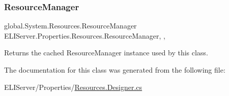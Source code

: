 \subsubsection{\texorpdfstring{Resource\+Manager}{ResourceManager}}
{\footnotesize\ttfamily global.\+System.\+Resources.\+Resource\+Manager E\+L\+I\+Server.\+Properties.\+Resources.\+Resource\+Manager\hspace{0.3cm}{\ttfamily [static]}, {\ttfamily [get]}, {\ttfamily [package]}}



Returns the cached Resource\+Manager instance used by this class. 



The documentation for this class was generated from the following file\+:\begin{DoxyCompactItemize}
\item 
E\+L\+I\+Server/\+Properties/\hyperlink{_resources_8_designer_8cs}{Resources.\+Designer.\+cs}\end{DoxyCompactItemize}
